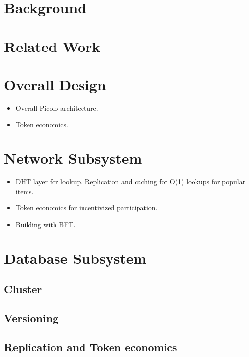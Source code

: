 \documentclass[a4paper]{article}
\begin{document}
\section{Background}
\section{Related Work}
\section{Overall Design}

    \begin{itemize}
        \item Overall Picolo architecture.
        \item Token economics.
    \end{itemize}
\section{Network Subsystem}

    \begin{itemize}
        \item DHT layer for lookup. Replication and caching for O(1) lookups for popular items.
        \item Token economics for incentivized participation.
        \item Building with BFT.
    \end{itemize}
\section{Database Subsystem}

\subsection{Cluster}
\subsection{Versioning}
\subsection{Replication and Token economics}
\end{document}
